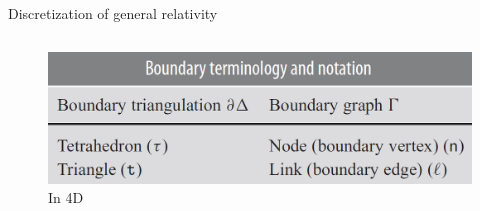 \documentclass{beamer}
\begin{document}
\begin{frame}{Discretization of general relativity}
\begin{list}{\maltese}{\leftmargin=1em \itemindent=0em}
\begin{minipage}{\linewidth}
\begin{columns}
{\begin{figure}
                    \includegraphics[width=\linewidth]{4.9}
                    \caption{In 4D}
                \end{figure}}
            \end{columns}
        \end{minipage}
    \end{list}
\end{frame}
\end{document}
